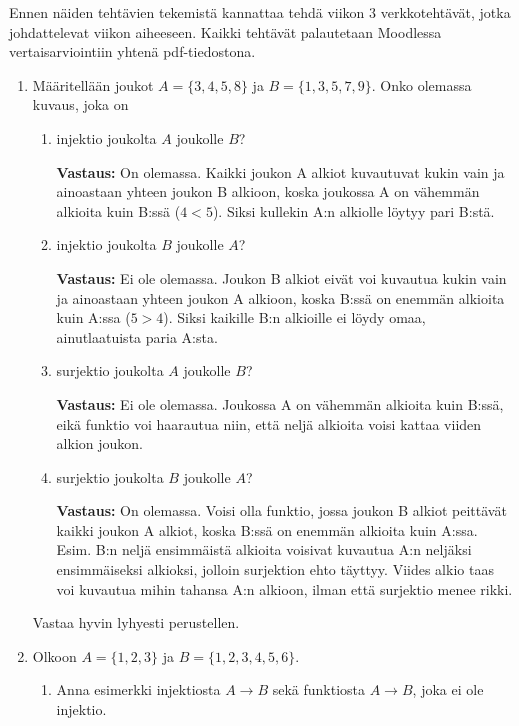 \documentclass[a4paper,12pt]{article}
\begin{document}
 

\otsikko

Ennen n\"aiden teht\"avien tekemist\"a kannattaa tehd\"a viikon $3$ verkkoteht\"av\"at, jotka johdattelevat viikon aiheeseen.
Kaikki teht\"av\"at palautetaan Moodlessa vertaisarviointiin yhten\"a pdf-tiedostona. \\

\begin{enumerate}

\item M\"a\"aritell\"a\"an joukot $A=\{3,4,5,8\}$ ja $B=\{1,3,5,7,9\}$.
Onko olemassa kuvaus, joka on 
\begin{enumerate}
    \item injektio joukolta $A$ joukolle $B$?

    \textbf{Vastaus:} On olemassa. Kaikki joukon A alkiot kuvautuvat kukin vain ja ainoastaan yhteen joukon B alkioon, koska joukossa A on vähemmän alkioita kuin B:ssä ($4<5$). Siksi kullekin A:n alkiolle löytyy pari B:stä.
    
    \item injektio joukolta $B$ joukolle $A$?

    \textbf{Vastaus:} Ei ole olemassa. Joukon B alkiot eivät voi kuvautua kukin vain ja ainoastaan yhteen joukon A alkioon, koska B:ssä on enemmän alkioita kuin A:ssa ($5>4$). Siksi kaikille B:n alkioille ei löydy omaa, ainutlaatuista paria A:sta.
    
    \item surjektio joukolta $A$ joukolle $B$?

    \textbf{Vastaus:} Ei ole olemassa. Joukossa A on vähemmän alkioita kuin B:ssä, eikä funktio voi haarautua niin, että neljä alkioita voisi kattaa viiden alkion joukon.
    
    \item surjektio joukolta $B$ joukolle $A$?

    \textbf{Vastaus:} On olemassa. Voisi olla funktio, jossa joukon B alkiot peittävät kaikki joukon A alkiot, koska B:ssä on enemmän alkioita kuin A:ssa. Esim. B:n neljä ensimmäistä alkioita voisivat kuvautua A:n neljäksi ensimmäiseksi alkioksi, jolloin surjektion ehto täyttyy. Viides alkio taas voi kuvautua mihin tahansa A:n alkioon, ilman että surjektio menee rikki.
    
\end{enumerate}
Vastaa  hyvin lyhyesti perustellen. \\

\item Olkoon $A=\{1,2,3\}$ ja $B=\{1,2,3,4,5,6\}$.
\begin{enumerate}
\item Anna esimerkki injektiosta $A \to B$ sekä funktiosta $A \to B$, joka ei ole injektio.


\end{enumerate}
\end{enumerate}
\end{document}
